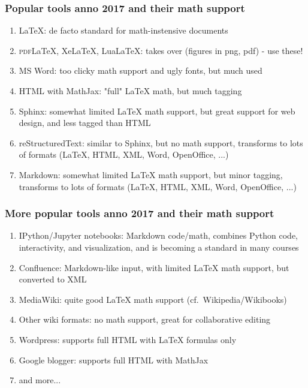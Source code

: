 \documentclass{beamer}
\begin{document}
\begin{frame}
\frametitle{Popular tools anno 2017 and their math support}

\begin{block}{}
\begin{enumerate}
\item {\LaTeX}: de facto standard for math-instensive documents

\item \textsc{pdf}{\LaTeX}, XeLaTeX, LuaLaTeX: takes over (figures in png, pdf) - use these!

\item MS Word: too clicky math support and ugly fonts, but much used

\item HTML with MathJax: "full" {\LaTeX} math, but much tagging

\item Sphinx: somewhat limited {\LaTeX} math support, but great support for web design, and less tagged than HTML

\item reStructuredText: similar to Sphinx, but no math support, transforms to lots of formats ({\LaTeX}, HTML, XML, Word, OpenOffice, ...)

\item Markdown: somewhat limited {\LaTeX} math support, but minor tagging, transforms to lots of formats ({\LaTeX}, HTML, XML, Word, OpenOffice, ...)
\end{enumerate}

\noindent
\end{block}
\end{frame}

\begin{frame}
\frametitle{More popular tools anno 2017 and their math support}

\begin{block}{}
\begin{enumerate}
\item IPython/Jupyter notebooks: Markdown code/math, combines Python code, interactivity, and visualization, and is becoming a standard in many courses

\item Confluence: Markdown-like input, with limited {\LaTeX} math support, but converted to XML

\item MediaWiki: quite good {\LaTeX} math support (cf.~Wikipedia/Wikibooks)

\item Other wiki formats: no math support, great for collaborative editing

\item Wordpress: supports full HTML with {\LaTeX} formulas only

\item Google blogger: supports full HTML with MathJax

\item and more...
\end{enumerate}

\noindent
\end{block}
\end{frame}
\end{document}
